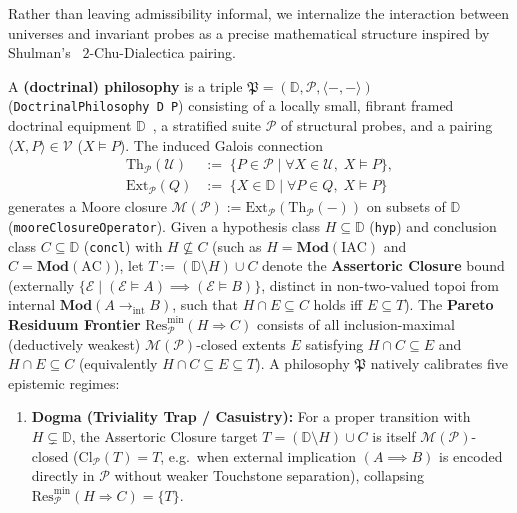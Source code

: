 Rather than leaving admissibility informal, we internalize the interaction between universes and invariant probes as a precise mathematical structure inspired by Shulman's~\cite{Shulman20} $2$-Chu-Dialectica pairing.

\begin{definition}\label{def:doctrinal-philosophy}%
%
A \textbf{(doctrinal) philosophy} is a triple $\mathfrak{P} = (\mathbb{D}, \mathcal{P}, \langle -, - \rangle)$ (\texttt{DoctrinalPhilosophy D P}) consisting of a locally small, fibrant framed doctrinal equipment $\mathbb{D}$~\cite{Shulman08,HHLN23}, a stratified suite $\mathcal{P}$ of structural probes, and a pairing $\langle X, P \rangle \in \mathcal{V}$ ($X \models P$). The induced Galois connection
\[
  \begin{aligned}
    \mathrm{Th}_{\mathcal{P}}(\mathcal{U}) &:=\; \{P \in \mathcal{P} \mid \forall X \in \mathcal{U},\; X \models P\}, \\
    \mathrm{Ext}_{\mathcal{P}}(Q) &:=\; \{X \in \mathbb{D} \mid \forall P \in Q,\; X \models P\}
  \end{aligned}
\]
generates a Moore closure $\mathcal{M}(\mathcal{P}) := \mathrm{Ext}_{\mathcal{P}}(\mathrm{Th}_{\mathcal{P}}(-))$ on subsets of $\mathbb{D}$ (\texttt{mooreClosureOperator}). Given a hypothesis class $H \subseteq \mathbb{D}$ (\texttt{hyp}) and conclusion class $C \subseteq \mathbb{D}$ (\texttt{concl}) with $H \not\subseteq C$ (such as $H = \mathbf{Mod}(\mathrm{IAC})$ and $C = \mathbf{Mod}(\mathrm{AC})$), let $T := (\mathbb{D} \setminus H) \cup C$ denote the \textbf{Assertoric Closure} bound (externally $\{\mathcal{E} \mid (\mathcal{E} \models A) \implies (\mathcal{E} \models B)\}$, distinct in non-two-valued topoi from internal $\mathbf{Mod}(A \to_{\mathrm{int}} B)$, such that $H \cap E \subseteq C$ holds iff $E \subseteq T$). The \textbf{Pareto Residuum Frontier} $\mathrm{Res}_{\mathcal{P}}^{\min}(H \Rightarrow C)$ consists of all inclusion-maximal (deductively weakest) $\mathcal{M}(\mathcal{P})$-closed extents $E$ satisfying $H \cap C \subseteq E$ and $H \cap E \subseteq C$ (equivalently $H \cap C \subseteq E \subseteq T$). A philosophy $\mathfrak{P}$ natively calibrates five epistemic regimes:
\begin{enumerate}
  \item \textbf{Dogma (Triviality Trap / Casuistry):} For a proper transition with $H \subsetneq \mathbb{D}$, the Assertoric Closure target $T = (\mathbb{D} \setminus H) \cup C$ is itself $\mathcal{M}(\mathcal{P})$-closed ($\mathrm{Cl}_{\mathcal{P}}(T) = T$, e.g.\ when external implication $(A \implies B)$ is encoded directly in $\mathcal{P}$ without weaker Touchstone separation), collapsing $\mathrm{Res}_{\mathcal{P}}^{\min}(H \Rightarrow C) = \{T\}$.

\end{enumerate}
\end{definition}
